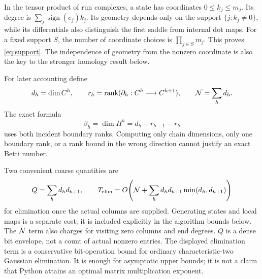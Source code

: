 In the tensor product of run complexes, a state has coordinates
\(0\le k_j\le m_j\). Its degree is \(\sum_j\operatorname{sign}(e_j)k_j\).
Its geometry depends only on the support \(\{j:k_j\ne0\}\), while its
differentials also distinguish the first saddle from internal dot maps.
For a fixed support \(S\), the number of coordinate choices is
\(\prod_{j\in S}m_j\). This proves \eqref{eq:support}.
The independence of geometry from the nonzero coordinate is also the
key to the stronger homology result below.

For later accounting define
\begin{equation}\label{eq:layers}
d_h=\dim C^h,\qquad r_h=\operatorname{rank}(\partial_h:C^h\longrightarrow C^{h+1}),
\qquad \mathcal N=\sum_h d_h.
\end{equation}
The exact formula
\begin{equation}\label{eq:betti}
\beta_h=\dim H^h=d_h-r_{h-1}-r_h
\end{equation}
uses both incident boundary ranks. Computing only chain dimensions, only
one boundary rank, or a rank bound in the wrong direction cannot justify
an exact Betti number.

Two convenient coarse quantities are
\[
Q=\sum_h d_hd_{h+1},\qquad
T_{\rm elim}=
O\!\left(\mathcal N+\sum_h d_h d_{h+1}\min(d_h,d_{h+1})\right)
\]
for elimination once the actual columns are supplied. Generating states
and local maps is a separate cost; it is included explicitly in the
algorithm bounds below. The \(\mathcal N\) term also charges for visiting zero
columns and end degrees.
\(Q\) is a dense bit envelope, not a count of actual nonzero entries.
The displayed elimination term is a conservative bit-operation bound for
ordinary characteristic-two Gaussian elimination. It is enough for
asymptotic upper bounds; it is not a claim that Python attains an optimal
matrix multiplication exponent.
